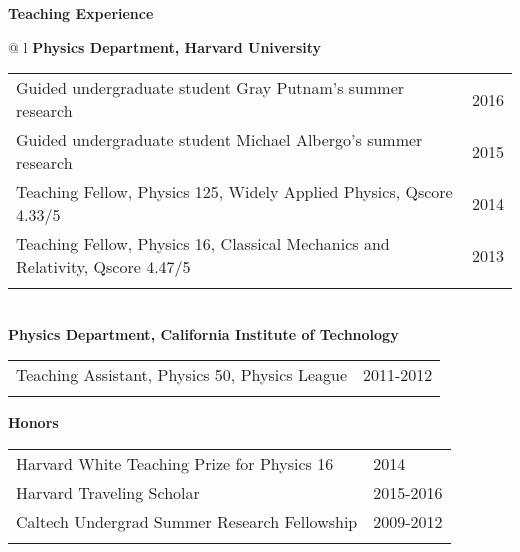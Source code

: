\documentclass[letterpaper,11pt,oneside]{article}
\begin{document}
\raggedright
\textbf{\Large{Teaching Experience}} \\
\vspace{-0.5cm}
 \normalsize
\begin{flushleft}
\hspace{1cm}
 \begin{tabular}{@{} l}
    \textbf{Physics Department, Harvard University} \\ 
    \begin{tabular}{@{} l l }
 Guided undergraduate student Gray Putnam's summer research & 2016\\
 Guided undergraduate student Michael Albergo's summer research & 2015\\
 Teaching Fellow, Physics 125, Widely Applied Physics, Qscore 4.33/5  & 2014\\
 Teaching Fellow, Physics 16, Classical Mechanics and Relativity, Qscore 4.47/5 & 2013\\
    \hspace{0.8\linewidth} & \hspace{0.1\linewidth} \\
     \end{tabular}
     \\
     \textbf{Physics Department, California Institute of Technology} \\
     \begin{tabular}{@{} l l }
 Teaching Assistant, Physics 50, Physics League & 2011-2012\\
    \hspace{0.8\linewidth} & \hspace{0.1\linewidth} \\
      \end{tabular}
      \end{tabular}
\end{flushleft}

\raggedright
 \textbf{\Large{Honors}} \\
\vspace{-0.5cm}
 \normalsize
\begin{flushleft}
\hspace{1cm}
\begin{tabular}{@{} l l }
 Harvard White Teaching Prize for Physics 16 & 2014\\
 Harvard Traveling Scholar & 2015-2016\\
 Caltech Undergrad Summer Research Fellowship & 2009-2012\\
    \hspace{0.8\linewidth} & \hspace{0.1\linewidth} \\
 \end{tabular}
\end{flushleft}
\end{document}

